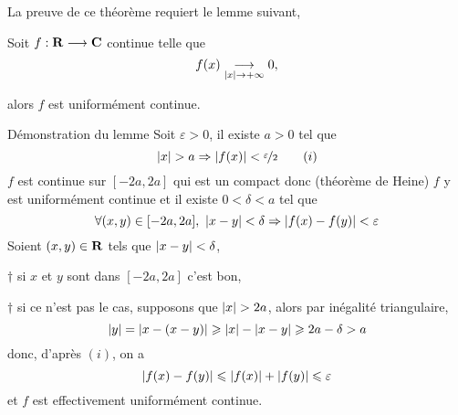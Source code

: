 \documentclass[a4paper,11pt, twoside]{article}
\begin{document}
La preuve de ce théorème requiert le lemme suivant,


\begin{lemme}
  Soit $f:\mathbf R\longrightarrow\mathbf C$ continue telle que 
  $$f(x)\underset{\left| x\right|\to+\infty}{\longrightarrow}0,$$
  
  alors $f$ est uniformément continue.
\end{lemme}


\begin{ProofC}{Démonstration du lemme}
  Soit $\varepsilon>0$, il existe $a>0$ tel que 
  $$\abs x>a\Rightarrow \abs{f(x)}<\Nfrac{2}\qquad (i)$$
  $f$ est continue sur $[-2a,2a]$ qui est un compact donc (théorème de Heine) $f$ y est uniformément continue et il existe $0<\delta<a$ tel que 
  $$\forall (x,y)\in [-2a,2a],\ \abs{x-y}<\delta\Rightarrow \abs{f(x)-f(y)}<\varepsilon$$
  Soient $(x,y)\in \mathbf R$ tels que $\left| x-y\right|<\delta$, 

  $\dagger$ si $x$ et $y$ sont dans $[-2a,2a]$ c'est bon,
  
  $\dagger$ si ce n'est pas le cas, supposons que $\abs x>2a$, alors par inégalité triangulaire,
  $$\left| y\right|=\left| x-(x-y)\right|\geqslant \left| x\right|-\left| x-y\right|\geqslant 2a-\delta>a$$
  donc, d'après $(i)$, on a 
  $$\left| f(x)-f(y)\right|\leqslant \left| f(x)\right|+\left| f(y)\right|\leqslant \varepsilon$$
  et $f$ est effectivement uniformément continue.
\end{ProofC}
\end{document}
